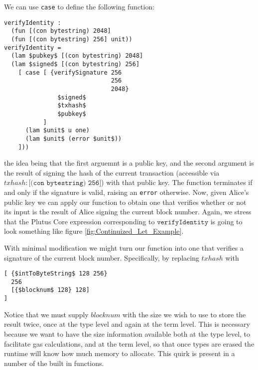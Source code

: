 \documentclass[../main.tex]{subfiles}
\begin{document}
We can use \texttt{case} to define the following function:
\begin{lstlisting}[basicstyle=\ttfamily,mathescape]
verifyIdentity :
  (fun [(con bytestring) 2048]
  (fun [(con bytestring) 256] unit))
verifyIdentity =
  (lam $pubkey$ [(con bytestring) 2048]                  
  (lam $signed$ [(con bytestring) 256]
    [ case [ {verifySignature 256 
                              256
                              2048}
               $signed$
               $txhash$
               $pubkey$
           ]
      (lam $unit$ u one)
      (lam $unit$ (error $unit$))
    ]))
\end{lstlisting}
the idea being that the first arguemnt is a public key, and the second argument is the result of signing the hash of the current transaction (accessible via $txhash : \texttt{[(con bytestring) 256]}$) with that public key. The function terminates if and only if the signature is valid, raising an \texttt{error} otherwise. Now, given Alice's public key we can apply our function to obtain one that verifies whether or not its input is the result of Alice signing the current block number. Again, we stress that the Plutus Core expression corresponding to $\texttt{verifyIdentity}$ is going to look something like figure \ref{fig:Continuized_Let_Example}.

With minimal modification we might turn our function into one that verifies a signature of the current block number. Specifically, by replacing $txhash$ with
\begin{lstlisting}[basicstyle=\ttfamily,mathescape]
[ {$intToByteString$ 128 256}
  256
  [{$blocknum$ 128} 128]
]
\end{lstlisting}
Notice that we must supply $blocknum$ with the size we wish to use to store the result twice, once at the type level and again at the term level. This is necessary because we want to have the size information available both at the type level, to facilitate gas calculations, and at the term level, so that once types are erased the runtime will know how much memory to allocate. This quirk is present in a number of the built in functions. 
\end{document}
